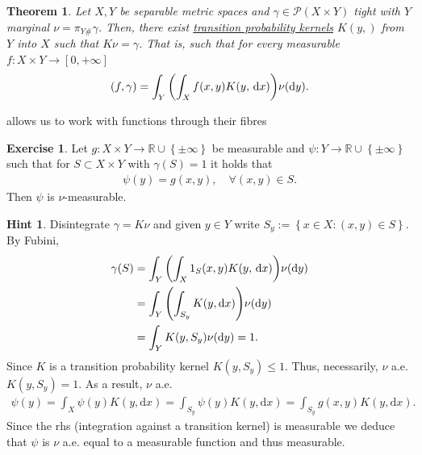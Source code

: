 \documentclass[
    a4paper,
    DIV=14,
    abstract=true,
    numbers=noenddot
]
{scrartcl}
\newtheorem{theorem}{Theorem}[section]
\theoremstyle{definition}
\newtheorem{exercise}{Exercise}
\newtheorem*{hint}{Hint}
\newcommand{\set}[1]{\left\{#1\right\}}
\renewcommand{\d}{\,\mathrm{d}}\newcommand{\dx}{\,\mathrm{d}x}
\newcommand{\rmm}[1]{\mathrm{#1}}
\newcommand{\R}{\mathbb{R}}
\newcommand{\Bb}{\mathcal{B}}
\newcommand{\Pp}{\mathcal{P}}
\begin{document}
\begin{theorem}\label{desintegration theorem}
    Let $X,Y$ be separable metric spaces and $\gamma \in \Pp (X\times Y)$ tight with $Y$  marginal $\nu = \pi_{Y\#} \gamma $. Then, there exist \href{https://en.wikipedia.org/wiki/Transition_kernel}{transition probability kernels} $K(y,)$ from $Y$ into $X$ such that $K \nu = \gamma $. That is, such that for every measurable $ f : X\times Y \to [0,+\infty] $
    \begin{align*}
        (f,\gamma) = \int_{Y} \qty(\int_{X}f(x,y)  K(y,\d x) )\nu (\rmm{d} y).
    \end{align*}
\end{theorem}
 allows us to work with functions through their fibres
\begin{exercise}\label{ex:fibre measurabilty}
    Let $g:X \times Y \to \R \cup \set{\pm \infty}$ be measurable and $\psi : Y \to \R\cup \set{\pm \infty}$  such that for $S \subset X\times Y$ with $\gamma(S)=1 $ it holds that
    \begin{align*}
        \psi (y)=g(x,y), \quad\forall (x,y) \in S.
    \end{align*}
    Then $\psi $ is $\nu$-measurable.
\end{exercise}
\begin{hint}
    Disintegrate $\gamma = K\nu $ and given $y \in Y$ write $S_y:= \set{x \in X : (x,y) \in S}$. By Fubini,
    \begin{align*}
        \gamma (S) & = \int_{Y} \qty(\int_{X}1_S(x,y)  K(y,\d x) )\nu (\rmm{d} y) \\
                   & =\int_Y\qty( \int_{S_y} K(y,\rmm{d} x))\nu(\rmm{d}y)         \\
                   & = \int_Y K(y,S_y)\nu(\rmm{d}y)=1.
    \end{align*}
    Since $K$ is a transition probability kernel  $K(y,S_y) \leq 1$. Thus, necessarily, $\nu$ a.e.  $K(y,S_y)=1$. As a result, $\nu $ a.e.
    \begin{align*}
        \psi(y)= \int_{X}\psi(y) K(y,\rmm{d}x )= \int_{S_y}\psi(y) K(y,\rmm{d}x )= \int_{S_y}g(x,y) K(y,\rmm{d}x ).
    \end{align*}
    Since the rhs (integration against a transition kernel) is measurable we deduce that $\psi $ is $\nu$ a.e. equal to a measurable function and thus measurable.
\end{hint}



\end{document}
